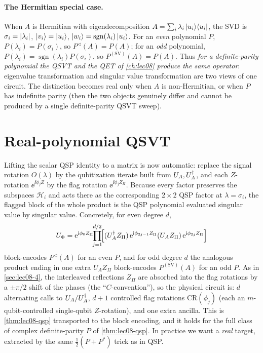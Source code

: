 \paragraph{The Hermitian special case.}
When $A$ is Hermitian with eigendecomposition $A=\sum_i\lambda_i\ket{u_i}\!\bra{u_i}$, the SVD is
$\sigma_i=\left\lvert \lambda_i \right\rvert$, $\ket{v_i}=\ket{u_i}$, $\ket{w_i}=\operatorname{sgn}
(\lambda_i)\ket{u_i}$. For an \emph{even} polynomial $P$, $P(\lambda_i)=P(\sigma_i)$,
so $P^{\triangleleft}(A)=P(A)$; for an \emph{odd} polynomial,
$P(\lambda_i)=\operatorname{sgn}(\lambda_i)P(\sigma_i)$, so
$P^{(\mathrm{SV})}(A)=P(A)$. Thus \emph{for a definite-parity polynomial the QSVT and
the QET of \cref{ch:lec08} produce the same operator}: eigenvalue transformation and
singular value transformation are two views of one circuit. The distinction becomes
real only when $A$ is non-Hermitian, or when $P$ has indefinite parity (then the two
objects genuinely differ and cannot be produced by a single definite-parity QSVT
sweep).

\section{Real-polynomial QSVT}
\label{sec:lec09-2}

Lifting the scalar QSP identity to a matrix is now automatic: replace the signal
rotation $O(\lambda)$ by the qubitization iterate built from $U_A,U_A^{\dagger}$, and each
$Z$-rotation $\ee^{\ii\phi_j Z}$ by the flag rotation $\ee^{\ii\phi_j Z_\Pi}$. Because
every factor preserves the subspaces $\mathcal H_i$ and acts there as the corresponding
$2\times2$ QSP factor at $\lambda=\sigma_i$, the flagged block of the whole product is
the QSP polynomial evaluated singular value by singular value. Concretely, for even
degree $d$,
\begin{equation}
  U_\Phi=\mathrm{e}^{\mathrm{i}\phi_0 Z_\Pi}\!\!\prod_{j=1}^{d/2}\!\Bigl[(U_A^{\dagger} Z_\Pi)\,
     \mathrm{e}^{\mathrm{i}\phi_{2j-1}Z_\Pi}(U_A Z_\Pi)\,\mathrm{e}^{\mathrm{i}\phi_{2j}Z_\Pi}\Bigr]
  \label{eq:lec09-Uphi-even}
\end{equation}
block-encodes $P^{\triangleleft}(A)$ for an even $P$, and for odd degree $d$ the
analogous product ending in one extra $U_A Z_\Pi$ block-encodes $P^{(\mathrm{SV})}(A)$
for an odd $P$. As in \cref{sec:lec08-4}, the interleaved reflections $Z_\Pi$ are
absorbed into the flag rotations by a $\pm\pi/2$ shift of the phases (the
``$C$-convention''), so the physical circuit is: $d$ alternating calls to $U_A/U_A^{\dagger}$,
$d+1$ controlled flag rotations $\mathrm{CR}(\phi_j)$ (each an
$m$-qubit-controlled single-qubit $Z$-rotation), and one extra ancilla. This is
\cref{thm:lec08-qsp} transported to the block encoding, and it holds for the full class
of complex definite-parity $P$ of \cref{thm:lec08-qsp}. In practice we want a
\emph{real} target, extracted by the same $\tfrac12(P+P^*)$ trick as in QSP.

